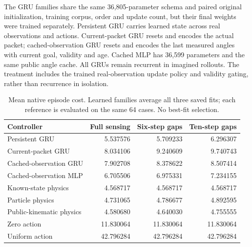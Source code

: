 \documentclass[10pt,letterpaper]{article}
\begin{document}
The GRU families share the same 36,805-parameter schema and paired original
initialization, training corpus, order and update count, but their final weights
were trained separately. Persistent GRU carries learned state across real
observations and actions. Current-packet GRU resets and encodes the actual
packet; cached-observation GRU resets and encodes the last measured angles
with current goal, validity and age. Cached MLP has 36,599 parameters and the
same public angle cache. All GRUs remain recurrent in imagined rollouts.
The treatment includes the trained real-observation update policy and validity
gating, rather than recurrence in isolation.

\begin{table}[h]
\centering\small
\caption{Mean native episode cost. Learned families average all three saved fits;
each reference is evaluated on the same 64 cases. No best-fit selection.}
\begin{tabular}{lrrr}
\toprule Controller & Full sensing & Six-step gaps & Ten-step gaps\\
\midrule
Persistent GRU & 5.537576 & 5.709233 & 6.296307\\
Current-packet GRU & 8.034106 & 9.240609 & 9.740743\\
Cached-observation GRU & 7.902708 & 8.378622 & 8.507414\\
Cached-observation MLP & 6.705506 & 6.975331 & 7.234155\\
Known-state physics & 4.568717 & 4.568717 & 4.568717\\
Particle physics & 4.731065 & 4.786677 & 4.892595\\
Public-kinematic physics & 4.580680 & 4.640030 & 4.755555\\
Zero action & 11.830064 & 11.830064 & 11.830064\\
Uniform action & 42.796284 & 42.796284 & 42.796284\\
\bottomrule
\end{tabular}
\end{table}
\end{document}
